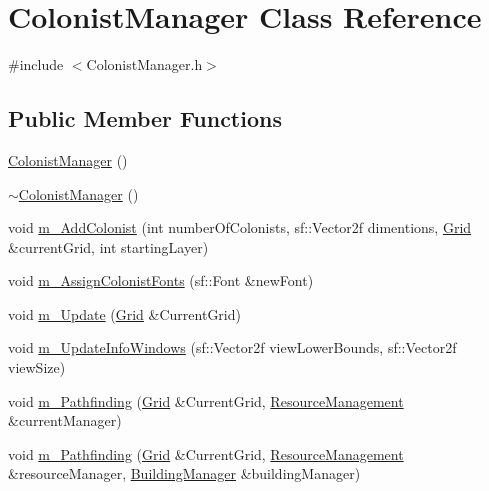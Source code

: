 \hypertarget{class_colonist_manager}{}\section{Colonist\+Manager Class Reference}
\label{class_colonist_manager}


{\ttfamily \#include $<$Colonist\+Manager.\+h$>$}

\subsection*{Public Member Functions}
\begin{DoxyCompactItemize}
\item 
\mbox{\hyperlink{class_colonist_manager_ae4103d1c28b871155a10f8df08974c7e}{Colonist\+Manager}} ()
\item 
\mbox{\hyperlink{class_colonist_manager_a33c8e31a0646e00653ce25c06f7e5038}{$\sim$\+Colonist\+Manager}} ()
\item 
void \mbox{\hyperlink{class_colonist_manager_a068d45eb539d9349c00771208c019187}{m\+\_\+\+Add\+Colonist}} (int number\+Of\+Colonists, sf\+::\+Vector2f dimentions, \mbox{\hyperlink{class_grid}{Grid}} \&current\+Grid, int starting\+Layer)
\item 
void \mbox{\hyperlink{class_colonist_manager_a67277f61ffb7e5e37657107088770041}{m\+\_\+\+Assign\+Colonist\+Fonts}} (sf\+::\+Font \&new\+Font)
\item 
void \mbox{\hyperlink{class_colonist_manager_a27e8588e8f4c341ea31d92cb122440bb}{m\+\_\+\+Update}} (\mbox{\hyperlink{class_grid}{Grid}} \&Current\+Grid)
\item 
void \mbox{\hyperlink{class_colonist_manager_abd1e80e0f01891857d81300eed3347f4}{m\+\_\+\+Update\+Info\+Windows}} (sf\+::\+Vector2f view\+Lower\+Bounds, sf\+::\+Vector2f view\+Size)
\item 
void \mbox{\hyperlink{class_colonist_manager_a4ae7bcfdb32a8862d950f36d357145dc}{m\+\_\+\+Pathfinding}} (\mbox{\hyperlink{class_grid}{Grid}} \&Current\+Grid, \mbox{\hyperlink{class_resource_management}{Resource\+Management}} \&current\+Manager)
\item 
void \mbox{\hyperlink{class_colonist_manager_a3c6476b726ac4ccf91be332be262810a}{m\+\_\+\+Pathfinding}} (\mbox{\hyperlink{class_grid}{Grid}} \&Current\+Grid, \mbox{\hyperlink{class_resource_management}{Resource\+Management}} \&resource\+Manager, \mbox{\hyperlink{class_building_manager}{Building\+Manager}} \&building\+Manager)
\item 

\end{DoxyCompactItemize}
